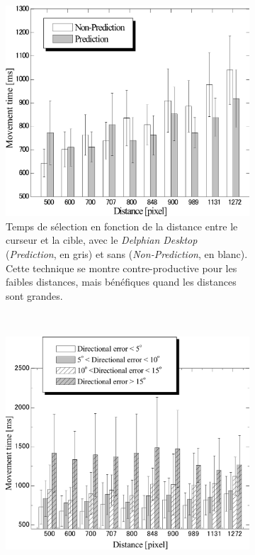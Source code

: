 	\begin{figure}[!htb]
		\begin{subfigure}[t]{0.49\textwidth}
			\centering
			\includegraphics[width=\textwidth]{figures/ch2/delphianTimes}
			\caption{Temps de sélection en fonction de la distance entre le curseur et la cible, avec le \emph{Delphian Desktop} (\emph{Prediction}, en gris) et sans (\emph{Non-Prediction}, en blanc). Cette technique se montre contre-productive pour les faibles distances, mais bénéfiques quand les distances sont grandes.}
			\label{fig:delphianTimes}
		\end{subfigure}
		~
		\begin{subfigure}[t]{0.49\textwidth}
			\centering
			\includegraphics[width=\textwidth]{figures/ch2/delphianTimesErrors}

\end{subfigure}
\end{figure}
